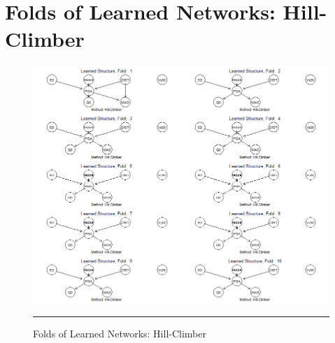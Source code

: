 
\section{Folds of Learned Networks: Hill-Climber} %

\label{AppendixB} %

\begin{figure}[htbp]%
	\centering
		\includegraphics[scale=0.5]{Figures/hc.png}
		\rule{35em}{0.5pt}
	\caption[Folds of Learned Networks: Hill-Climber]{Folds of Learned Networks: Hill-Climber}
\end{figure}